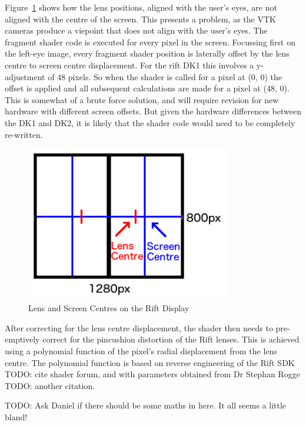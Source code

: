\documentclass[MSc,paper=a4,pagesize=auto]{icldt}
\begin{document}
Figure~\ref{fig:rift_screen} shows how the lens positions, aligned with the user's eyes, are not aligned with the centre of the screen. This presents a problem, as the VTK cameras produce a viepoint that does not align with the user's eyes. The fragment shader code is executed for every pixel in the screen. Focussing first on the left-eye image, every fragment shader position is laterally offset by the lens centre to screen centre displacement. For the rift DK1 this involves a y-adjustment of 48 pixels. So when the shader is called for a pixel at (0, 0) the offset is applied and all subsequent calculations are made for a pixel at (48, 0). This is somewhat of a brute force solution, and will require revision for new hardware with different screen offsets. But given the hardware differences between the DK1 and DK2, it is likely that the shader code would need to be completely re-written.

\begin{figure}[htbp!]
    \centering
    \includegraphics[width=0.8\textwidth]{resources/rift_screen}
    \caption{Lens and Screen Centres on the Rift Display}
    \label{fig:rift_screen}
\end{figure}

After correcting for the lens centre displacement, the shader then needs to pre-emptively correct for the pincushion distortion of the Rift lenses. This is achieved using a polynomial function of the pixel's radial displacement from the lens centre. The polynomial function is based on reverse engineering of the Rift SDK TODO: cite shader forum, and with parameters obtained from Dr Stephan Rogge TODO: another citation. 

TODO: Ask Daniel if there should be some maths in here. It all seems a little bland!
\end{document}
